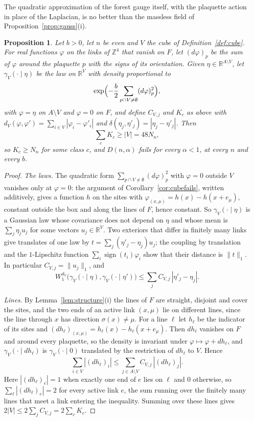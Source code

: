 \documentclass[aps,prd,twocolumn,superscriptaddress,nofootinbib,longbibliography,floatfix,amsmath,amssymb,10pt]{revtex4-2}
\newtheorem{proposition}[theorem]{Proposition}
\theoremstyle{definition}
\theoremstyle{remark}
\newcommand{\R}{\mathbb{R}}
\newcommand{\Z}{\mathbb{Z}}
\begin{document}
The quadratic approximation of the forest gauge itself, with the plaquette
action in place of the Laplacian, is no better than the massless field of
Proposition~\ref{prop:gauss}(i).

\begin{proposition}\label{prop:gaussforest}
Let $b>0$, let $n$ be even and $V$ the cube of Definition~\ref{def:cube}.
For real functions $\varphi$ on the links of $\Z^4$ that vanish on $F$, let
$(d\varphi)_p$ be the sum of $\varphi$ around the plaquette $p$ with the signs
of its orientation. Given $\eta\in\R^{A\setminus V}$, let
$\gamma_V(\cdot\mid\eta)$ be the law on $\R^V$ with density proportional to
\[
\exp\Bigl(-\frac b2\sum_{p\cap V\ne\emptyset}(d\varphi)_p^2\Bigr),
\]
with $\varphi=\eta$ on $A\setminus V$ and $\varphi=0$ on $F$, and define
$C_{V,j}$ and $K_c$ as above with $d_V(\varphi,\varphi')=\sum_{i\in V}
|\varphi_i-\varphi'_i|$ and $\delta(\eta_j,\eta'_j)=|\eta_j-\eta'_j|$. Then
\[
\sum_cK_c\ge|V|=48N_n ,
\]
so $K_c\ge N_n$ for some class $c$, and $D(n,\alpha)$ fails for every
$\alpha<1$, at every $n$ and every $b$.
\end{proposition}

\begin{proof}
\emph{The laws.} The quadratic form $\sum_{p\cap V\ne\emptyset}(d\varphi)_p^2$
with $\varphi=0$ outside $V$ vanishes only at $\varphi=0$: the argument of
Corollary~\ref{cor:cubefails}, written additively, gives a function $h$ on
the sites with $\varphi_{(x,\mu)}=h(x)-h(x+e_\mu)$, constant outside the box
and along the lines of $F$, hence constant. So $\gamma_V(\cdot\mid\eta)$ is a
Gaussian law whose covariance does not depend on $\eta$ and whose mean is
$\sum_j\eta_ju_j$ for some vectors $u_j\in\R^V$. Two exteriors that differ
in finitely many links give translates of one law by
$t=\sum_j(\eta'_j-\eta_j)u_j$; the coupling by translation and the
$1$-Lipschitz function $\sum_i\operatorname{sign}(t_i)\varphi_i$ show that
their distance is $\|t\|_1$. In particular $C_{V,j}=\|u_j\|_1$, and
\[
W_1^{d_V}\bigl(\gamma_V(\cdot\mid\eta),\gamma_V(\cdot\mid\eta')\bigr)\le
\sum_jC_{V,j}\,|\eta'_j-\eta_j| .
\]

\emph{Lines.} By Lemma~\ref{lem:structure}(i) the lines of $F$ are straight,
disjoint and cover the sites, and the two ends of an active link $(x,\mu)$
lie on different lines, since the line through $x$ has direction
$\sigma(x)\ne\mu$. For a line $\ell$ let $h_\ell$
be the indicator of its sites and $(dh_\ell)_{(x,\mu)}=h_\ell(x)-h_\ell(x+e_\mu)$.
Then $dh_\ell$ vanishes on $F$ and around every plaquette, so the density is
invariant under $\varphi\mapsto\varphi+dh_\ell$, and
$\gamma_V(\cdot\mid dh_\ell)$ is $\gamma_V(\cdot\mid0)$ translated by the
restriction of $dh_\ell$ to $V$. Hence
\[
\sum_{i\in V}|(dh_\ell)_i|\le\sum_{j\in A\setminus V}C_{V,j}\,|(dh_\ell)_j| .
\]
Here $|(dh_\ell)_e|=1$ when exactly one end of $e$ lies on $\ell$ and $0$
otherwise, so $\sum_\ell|(dh_\ell)_e|=2$ for every active link $e$, the sum
running over the finitely many lines that meet a link entering the
inequality. Summing over these lines gives $2|V|\le2\sum_jC_{V,j}=
2\sum_cK_c$.
\end{proof}
\end{document}
